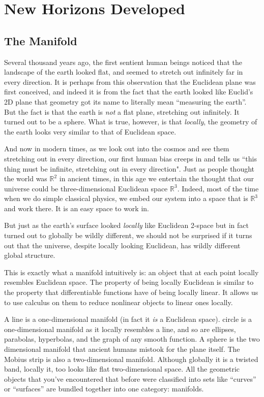 	
	\chapter{New Horizons Developed}
	
	\section{The Manifold} %
	\label{sec:the_manifold}

	Several thousand years ago, the first sentient human beings noticed that the landscape of the earth looked flat, and seemed to stretch out infinitely far in every direction. It is perhaps from this observation that the Euclidean plane was first conceived, and indeed it is from the fact that the earth looked like Euclid's 2D plane that geometry got its name to literally mean ``measuring the earth''. But the fact is that the earth is \emph{not} a flat plane, stretching out infinitely. It turned out to be a sphere. What is true, however, is that \emph{locally}, the geometry of the earth looks very similar to that of Euclidean space. 
	
	And now in modern times, as we look out into the cosmos and see them stretching out in every direction, our first human bias creeps in and tells us ``this thing must be infinite, stretching out in every direction". Just as people thought the world was $\mathbb R^2$ in ancient times, in this age we entertain the thought that our universe could be three-dimensional Euclidean space $\mathbb R^3$. Indeed, most of the time when we do simple classical physics, we embed our system into a space that is $\mathbb R^3$ and work there. It is an easy space to work in. 
	
	But just as the earth's surface looked \emph{locally} like Euclidean 2-space but in fact turned out to globally be wildly different, we should not be surprised if it turns out that the universe, despite locally looking Euclidean, has wildly different global structure. 
	
	This is exactly what a manifold intuitively is: an object that at each point locally resembles Euclidean space. The property of being locally Euclidean is similar to the property that differentiable functions have of being locally linear. It allows us to use calculus on them to reduce nonlinear objects to linear ones locally. 
	
	A line is a one-dimensional manifold (in fact it \emph{is} a Euclidean space).  circle is a one-dimensional manifold as it locally resembles a line, and so are ellipses, parabolas, hyperbolas, and the graph of any smooth function. A sphere is the two dimensional manifold that ancient humans mistook for the plane itself. The Mobius strip is also a two-dimensional manifold. Although globally it is a twisted band, locally it, too looks like flat two-dimensional space. All the geometric objects that you've encountered that before were classified into sets like ``curves'' or ``surfaces'' are bundled together into one category: manifolds. 
	
